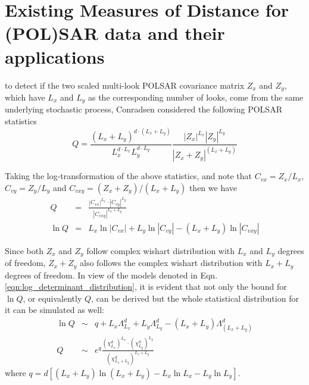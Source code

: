 \section{Existing Measures of Distance for (POL)SAR data and their applications}

to detect if the two scaled multi-look POLSAR covariance matrix $Z_x$ and $Z_y$,
  which have $L_x$ and $L_y$ as the corresponding number of looks,
  come from the same underlying stochastic process,
Conradsen considered \cite{Conradsen_2003_TGRS_4} the following POLSAR statistics
\begin{equation}
  Q = \frac{(L_x+L_y)^{d \cdot (L_x+L_y)}}{L_x^{d \cdot L_x} L_y^{d \cdot L_y}} \frac{|Z_x|^{L_x} |Z_y|^{L_y} }{|Z_x+Z_y|^{(L_x+L_y)}}
\end{equation}

Taking the log-transformation of the above statistics, and note that $C_{vx} = Z_x / L_x$, $C_{vy} = Z_y / L_y$ and $C_{vxy} = (Z_x + Z_y)/(L_x + L_y)$ then we have
\begin{eqnarray}
  Q &=& \frac{|C_{vx}|^{L_x} \cdot |C_{vy}|^{L_y} }{|C_{vxy}|^{L_x + L_y}} \nonumber \\
  \ln Q &=& L_x \ln |C_{vx}| + L_y \ln |C_{vy}| - (L_x + L_y) \ln |C_{vxy}| \nonumber
\end{eqnarray}

Since both $Z_x$ and $Z_y$ follow complex wishart distribution with $L_x$ and $L_y$ degrees of freedom,
  $Z_x+Z_y$ also follows the complex wishart distribution with $L_x + L_y$ degrees of freedom.
In view of the models denoted in Eqn. \ref{eqn:log_determinant_distribution},
  it is evident that not only the bound for $\ln Q$, or equivalently $Q$, can be derived
  but the whole statistical distribution for it can be simulated as well:
\begin{eqnarray}
  \ln{Q} &\sim&  q + L_x \Lambda^d_{L_x} + L_y \Lambda^d_{L_y} - (L_x + L_y) \Lambda^d_{(L_x + L_y)} \\
  Q &\sim& e^q \frac{(\chi^d_{L_x})^{L_x} \cdot (\chi^d_{L_y})^{L_y}}{(\chi^d_{L_x + L_y})^{L_x + L_y}}  
\end{eqnarray}
where $q = d \left[ (L_x + L_y) \ln(L_x + L_y) - L_x \ln{L_x} - L_y \ln{L_y} \right]$.

